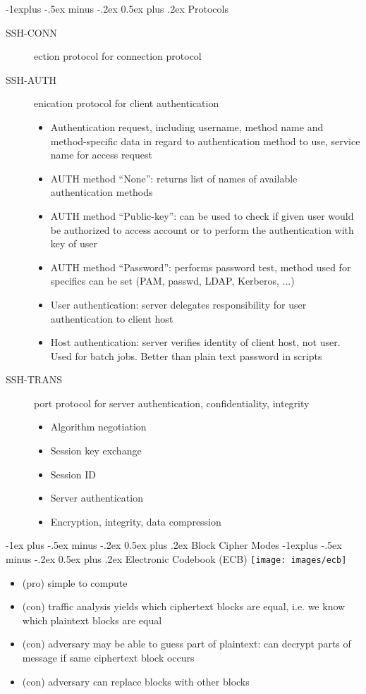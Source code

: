 \documentclass[a4paper,twocolumn]{article}
\makeatletter
\newenvironment{itemization}[1][\small]{%
    \begin{itemize}[leftmargin=*]
            #1
        }{%
    \end{itemize}
}
\renewcommand{\section}{%
    \@startsection{section}{1}{0mm}%
    {-1ex plus -.5ex minus -.2ex}%
    {0.5ex plus .2ex}%
    {\normalfont\normalsize\bfseries\sectionrule{12pt}{0.4pt}{0pt}{0pt}}
}
\renewcommand{\subsection}{%
    \@startsection{subsection}{2}{0mm}%
    {-1explus -.5ex minus -.2ex}%
    {0.5ex plus .2ex}%
    {\normalfont\small\bfseries}
}
\makeatother
\begin{document}
\begin{footnotesize}
\subsection{Protocols}
\begin{description}
\item[SSH-CONN]ection protocol for connection protocol
\item[SSH-AUTH]enication protocol for client authentication
\begin{itemization}
\item Authentication request, including username, method name and method-specific data in regard to authentication method to use, service name for access request
\item AUTH method ``None'': returns list of names of available authentication methods
\item AUTH method ``Public-key'': can be used to check if given user would be authorized to access account or to perform the authentication with key of user
\item AUTH method ``Password'': performs password test, method used for specifics can be set (PAM, passwd, LDAP, Kerberos, ...)
\item User authentication: server delegates responsibility for user authentication to client host
\item Host authentication: server verifies identity of client host, not user. Used for batch jobs. Better than plain text password in scripts
\end{itemization}
\item[SSH-TRANS]port protocol for server authentication, confidentiality, integrity
\begin{itemization}
\item Algorithm negotiation
\item Session key exchange
\item Session ID
\item Server authentication
\item Encryption, integrity, data compression
\end{itemization}
\end{description}

\section{Block Cipher Modes}
\subsection{Electronic Codebook (ECB)}
\texttt{[image: images/ecb]}
\begin{itemization}
\item (pro) simple to compute
\item (con) traffic analysis yields which ciphertext blocks are equal, i.e. we know which plaintext blocks are equal
\item (con) adversary may be able to guess part of plaintext: can decrypt parts of message if same ciphertext block occurs
\item (con) adversary can replace blocks with other blocks
\end{itemization}


\end{footnotesize}
\end{document}
